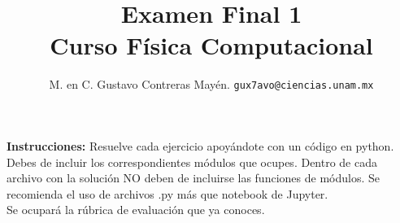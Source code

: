 
\usepackage{minted}

\author{M. en C. Gustavo Contreras Mayén. \texttt{gux7avo@ciencias.unam.mx}}
\title{Examen Final 1 \\ {\large Curso Física Computacional}}
\date{ }


\maketitle
\fontsize{14}{14}\selectfont

\textbf{Instrucciones: } Resuelve cada ejercicio apoyándote con un código en python. Debes de incluir los correspondientes módulos que ocupes. Dentro de cada archivo con la solución NO deben de incluirse las funciones de módulos. Se recomienda el uso de archivos .py más que notebook de Jupyter.
\\
\noindent
Se ocupará la rúbrica de evaluación que ya conoces.

